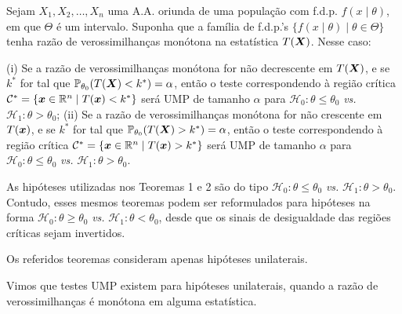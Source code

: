 \begin{theorem}
Sejam $X_1,X_2,\ldots,X_n$ uma A.A. oriunda de uma população com f.d.p. $f(x\mid\theta)$, em que $\Theta$ é um intervalo. Suponha que a família de f.d.p.'s $\{f(x\mid\theta)\mid\theta\in\Theta\}$ tenha razão de verossimilhanças monótona na estatística $T(\bm{X})$. Nesse caso:
\begin{outline}
\1 (i) Se a razão de verossimilhanças monótona for não decrescente em $T(\bm{X})$, e se $k^*$ for tal que $\mathbb{P}_{\theta_0}(T(\bm{X})<k^*)=\alpha$, então o teste correspondendo à região crítica $\mathcal{C}^*=\{\bm{x}\in\mathbb{R}^n\mid T(\bm{x})<k^*\}$ será UMP de tamanho $\alpha$ para $\mathcal{H}_0:\theta\leq\theta_0$ \emph{vs.} $\mathcal{H}_1:\theta>\theta_0$;
\1 (ii) Se a razão de verossimilhanças monótona for não crescente em $T(\bm{x})$, e se $k^*$ for tal que $\mathbb{P}_{\theta_0}(T(\bm{X})>k^*)=\alpha$, então o teste correspondendo à região crítica $\mathcal{C}^*=\{\bm{x}\in\mathbb{R}^n\mid T(\bm{x})>k^*\}$ será UMP de tamanho $\alpha$ para $\mathcal{H}_0:\theta\leq\theta_0$ \emph{vs.} $\mathcal{H}_1:\theta>\theta_0$.
\end{outline}
\end{theorem}

\begin{note}
	\leavevmode
	\begin{outline}[enumerate]
		\1 As hipóteses utilizadas nos Teoremas 1 e 2 são do tipo $\mathcal{H}_0:\theta\leq\theta_0$ \emph{vs.} $\mathcal{H}_1:\theta>\theta_0$. Contudo, esses mesmos teoremas podem ser reformulados para hipóteses na forma $\mathcal{H}_0:\theta\geq\theta_0$ \emph{vs.} $\mathcal{H}_1:\theta<\theta_0$, desde que os sinais de desigualdade das regiões críticas sejam invertidos.
	\end{outline}
\end{note}

\begin{note}
	\leavevmode
	\begin{outline}[enumerate]
		\1 Os referidos teoremas consideram apenas hipóteses unilaterais.
	\end{outline}
\end{note}

Vimos que testes UMP existem para hipóteses unilaterais, quando a razão de verossimilhanças é monótona em alguma estatística.

